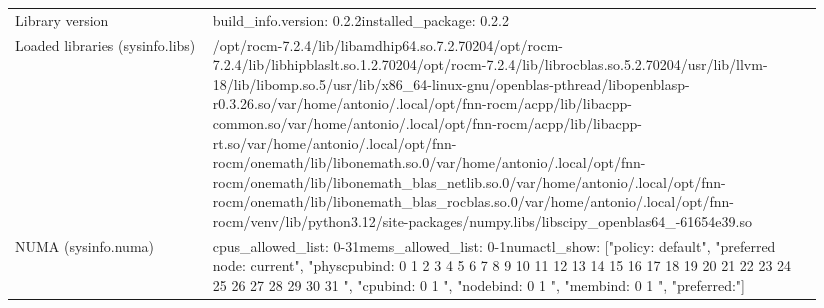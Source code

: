 \begin{longtable}{>{\raggedright\arraybackslash}p{0.23\linewidth}>{\raggedright\arraybackslash}p{0.71\linewidth}}
Library version & build\_\allowbreak{}info.version: 0.2.2\newline installed\_\allowbreak{}package: 0.2.2 \\
Loaded libraries (sysinfo.libs) & /\allowbreak{}opt/\allowbreak{}rocm-7.2.4/\allowbreak{}lib/\allowbreak{}libamdhip64.so.7.2.70204\newline /\allowbreak{}opt/\allowbreak{}rocm-7.2.4/\allowbreak{}lib/\allowbreak{}libhipblaslt.so.1.2.70204\newline /\allowbreak{}opt/\allowbreak{}rocm-7.2.4/\allowbreak{}lib/\allowbreak{}librocblas.so.5.2.70204\newline /\allowbreak{}usr/\allowbreak{}lib/\allowbreak{}llvm-18/\allowbreak{}lib/\allowbreak{}libomp.so.5\newline /\allowbreak{}usr/\allowbreak{}lib/\allowbreak{}x86\_\allowbreak{}64-linux-gnu/\allowbreak{}openblas-pthread/\allowbreak{}libopenblasp-r0.3.26.so\newline /\allowbreak{}var/\allowbreak{}home/\allowbreak{}antonio/\allowbreak{}.local/\allowbreak{}opt/\allowbreak{}fnn-rocm/\allowbreak{}acpp/\allowbreak{}lib/\allowbreak{}libacpp-common.so\newline /\allowbreak{}var/\allowbreak{}home/\allowbreak{}antonio/\allowbreak{}.local/\allowbreak{}opt/\allowbreak{}fnn-rocm/\allowbreak{}acpp/\allowbreak{}lib/\allowbreak{}libacpp-rt.so\newline /\allowbreak{}var/\allowbreak{}home/\allowbreak{}antonio/\allowbreak{}.local/\allowbreak{}opt/\allowbreak{}fnn-rocm/\allowbreak{}onemath/\allowbreak{}lib/\allowbreak{}libonemath.so.0\newline /\allowbreak{}var/\allowbreak{}home/\allowbreak{}antonio/\allowbreak{}.local/\allowbreak{}opt/\allowbreak{}fnn-rocm/\allowbreak{}onemath/\allowbreak{}lib/\allowbreak{}libonemath\_\allowbreak{}blas\_\allowbreak{}netlib.so.0\newline /\allowbreak{}var/\allowbreak{}home/\allowbreak{}antonio/\allowbreak{}.local/\allowbreak{}opt/\allowbreak{}fnn-rocm/\allowbreak{}onemath/\allowbreak{}lib/\allowbreak{}libonemath\_\allowbreak{}blas\_\allowbreak{}rocblas.so.0\newline /\allowbreak{}var/\allowbreak{}home/\allowbreak{}antonio/\allowbreak{}.local/\allowbreak{}opt/\allowbreak{}fnn-rocm/\allowbreak{}venv/\allowbreak{}lib/\allowbreak{}python3.12/\allowbreak{}site-packages/\allowbreak{}numpy.libs/\allowbreak{}libscipy\_\allowbreak{}openblas64\_\allowbreak{}-61654e39.so \\
NUMA (sysinfo.numa) & cpus\_\allowbreak{}allowed\_\allowbreak{}list: 0-31\newline mems\_\allowbreak{}allowed\_\allowbreak{}list: 0-1\newline numactl\_\allowbreak{}show: ["policy: default", "preferred node: current", "physcpubind: 0 1 2 3 4 5 6 7 8 9 10 11 12 13 14 15 16 17 18 19 20 21 22 23 24 25 26 27 28 29 30 31 ", "cpubind: 0 1 ", "nodebind: 0 1 ", "membind: 0 1 ", "preferred:"] \\

\end{longtable}
